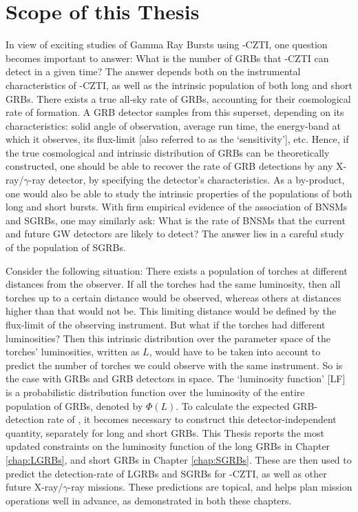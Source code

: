 \section{Scope of this Thesis}
\label{sec:scope}
In view of exciting studies of Gamma Ray Bursts using \AS -CZTI, one question becomes important to answer: What is the number of GRBs that \AS -CZTI can detect in a given time? The answer depends both on the instrumental characteristics of \AS -CZTI, as well as the intrinsic population of both long and short GRBs. There exists a true all-sky rate of GRBs, accounting for their cosmological rate of formation. A GRB detector samples from this superset, depending on its characteristics: solid angle of observation, average run time, the energy-band at which it observes, its flux-limit [also referred to as the `sensitivity'], etc. Hence, if the true cosmological and intrinsic distribution of GRBs can be theoretically constructed, one should be able to recover the rate of GRB detections by any X-ray/$\gamma$-ray detector, by specifying the detector's characteristics. As a by-product, one would also be able to study the intrinsic properties of the populations of both long and short bursts. With firm empirical evidence of the association of BNSMs and SGRBs, one may similarly ask: What is the rate of BNSMs that the current and future GW detectors are likely to detect? The answer lies in a careful study of the population of SGRBs.

Consider the following situation: There exists a population of torches at different distances from the observer. If all the torches had the same luminosity, then all torches up to a certain distance would be observed, whereas others at distances higher than that would not be. This limiting distance would be defined by the flux-limit of the observing instrument. But what if the torches had different luminosities? Then this intrinsic distribution over the parameter space of the torches' luminosities, written as $L$, would have to be taken into account to predict the number of torches we could observe with the same instrument. So is the case with GRBs and GRB detectors in space. The `luminosity function' [LF] is a probabilistic distribution function over the luminosity of the entire population of GRBs, denoted by $\Phi (L)$. To calculate the expected GRB-detection rate of \AS, it becomes necessary to construct this detector-independent quantity, separately for long and short GRBs. This Thesis reports the most updated constraints on the luminosity function of the long GRBs in Chapter \ref{chap:LGRBs}, and short GRBs in Chapter \ref{chap:SGRBs}. These are then used to predict the detection-rate of LGRBs and SGRBs for \AS -CZTI, as well as other future X-ray/$\gamma$-ray missions. These predictions are topical, and helps plan mission operations well in advance, as demonstrated in both these chapters.

